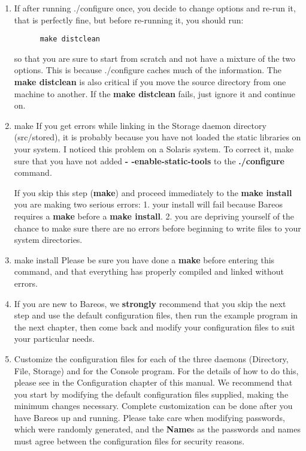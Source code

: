\begin{enumerate}
\item If after running ./configure once, you decide to change options  and
   re-run it, that is perfectly fine, but before re-running it,  you should run:

\footnotesize
\begin{verbatim}
      make distclean
\end{verbatim}
\normalsize

so that you are sure to start from scratch and not have a  mixture of the two
options. This is because ./configure  caches much of the information. The {\bf
make distclean}  is also critical if you move the source directory from one
machine to another. If the {\bf make distclean} fails,  just ignore it and
continue on.

\item make
   If you get errors while linking in the Storage daemon directory
   (src/stored), it is probably because you have not loaded the static
   libraries on your system.  I noticed this problem on a Solaris system.
   To correct it, make sure that you have not added {\bf
   {-} {-}enable-static-tools} to the {\bf ./configure} command.

   If you skip this step ({\bf make}) and proceed immediately to the {\bf
   make install} you are making two serious errors: 1.  your install will
   fail because Bareos requires a {\bf make} before a {\bf make install}.
   2.  you are depriving yourself of the chance to make sure there are no
   errors before beginning to write files to your system directories.


\item make install
   Please be sure you have done a {\bf make} before entering this command,
   and that everything has properly compiled and linked without errors.


\item If you are new to Bareos, we {\bf strongly} recommend that you skip
   the next step and use the default configuration files, then run the
   example program in the next chapter, then come back and modify your
   configuration files to suit your particular needs.

\item Customize the configuration files for each of the three daemons
   (Directory, File, Storage) and for the Console program.  For the details
   of how to do this, please see  in the Configuration chapter of this manual.  We
   recommend that you start by modifying the default configuration files
   supplied, making the minimum changes necessary.  Complete customization
   can be done after you have Bareos up and running.  Please take care when
   modifying passwords, which were randomly generated, and the {\bf Name}s
   as the passwords and names must agree between the configuration files
   for security reasons.


\end{enumerate}
